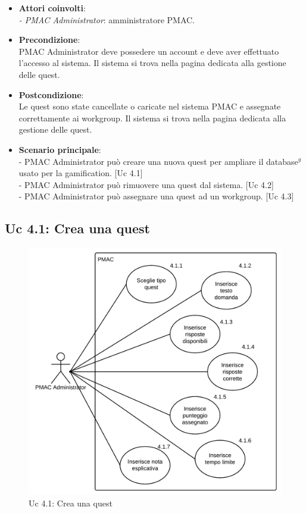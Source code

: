 {\begin{itemize}
\item \textbf{Attori coinvolti}:\\
\emph{- PMAC Administrator}: amministratore PMAC.

\item \textbf{Precondizione}:\\
PMAC Administrator deve possedere un account e deve aver effettuato l'accesso al sistema. Il sistema si trova nella pagina dedicata alla gestione delle quest.

\item \textbf{Postcondizione}:\\
Le quest sono state cancellate o caricate nel sistema PMAC e assegnate correttamente ai workgroup. Il sistema si trova nella pagina dedicata alla gestione delle quest.

\item \textbf{Scenario principale}:\\
- PMAC Administrator può creare una nuova quest per ampliare il database$^g$ usato per la gamification. [Uc 4.1]\\
- PMAC Administrator può rimuovere una quest dal sistema. [Uc 4.2]\\
- PMAC Administrator può assegnare una quest ad un workgroup. [Uc 4.3]
\end{itemize}

\newpage

\subsection{Uc 4.1: Crea una quest}
\begin{figure}[ht]
\centering
\caption{Uc 4.1: Crea una quest}
\includegraphics[scale=0.9]{images/cap1/UseCase/Uc4_1} %
\end{figure}

}
